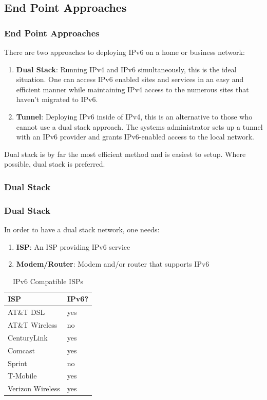 \documentclass[aspectratio=169]{beamer}
\begin{document}
\subsection{End Point Approaches}
\begin{frame}
\frametitle{End Point Approaches}
There are two approaches to deploying IPv6 on a home or business network:
\pause
\begin{enumerate}
	\item \textbf{Dual Stack}: Running IPv4 and IPv6 simultaneously, this is the ideal situation. One can access IPv6 enabled sites and services in an easy and efficient manner while maintaining IPv4 access to the numerous sites that haven't migrated to IPv6.
	\pause
	\item \textbf{Tunnel}: Deploying IPv6 inside of IPv4, this is an alternative to those who cannot use a dual stack approach. The systems administrator sets up a tunnel with an IPv6 provider and grants IPv6-enabled access to the local network.
\end{enumerate}

\pause
Dual stack is by far the most efficient method and is easiest to setup. Where possible, dual stack is preferred.
\end{frame}

\subsubsection{Dual Stack}
\begin{frame}
\frametitle{Dual Stack}
In order to have a dual stack network, one needs:
\begin{enumerate}
	\item \textbf{ISP}: An ISP providing IPv6 service
	\pause
	\item \textbf{Modem/Router}: Modem and/or router that supports IPv6
	\pause
\end{enumerate}
\begin{table}
\begin{tabular}{|l|l|}
\hline
\textbf{ISP} & \textbf{IPv6?}\\
\hline
AT\&T DSL & yes\\
\hline
AT\&T Wireless & no\\
\hline
CenturyLink & yes\\
\hline
Comcast & yes\\
\hline
Sprint & no\\
\hline
T-Mobile & yes\\
\hline
Verizon Wireless & yes\\
\hline
\end{tabular}
\caption{IPv6 Compatible ISPs}
\label{tbl:isps}
\end{table}
\end{frame}
\end{document}
